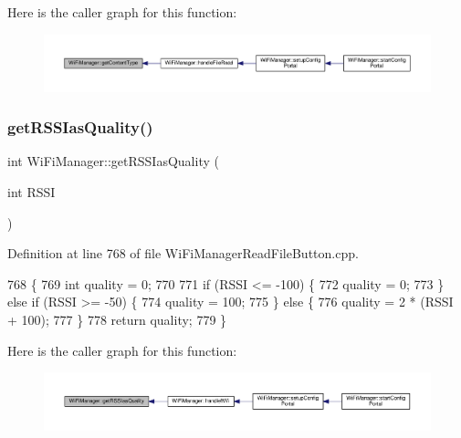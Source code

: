 Here is the caller graph for this function\+:
\nopagebreak
\begin{figure}[H]
\begin{center}
\leavevmode
\includegraphics[width=350pt]{d4/dc8/class_wi_fi_manager_a40f123fd290c3e331c9785d19a88f3b8_icgraph}
\end{center}
\end{figure}
\mbox{\label{class_wi_fi_manager_ae71cfd6bd70ada2ca02e1d20b152d0e5}} 
\subsubsection{\texorpdfstring{get\+R\+S\+S\+Ias\+Quality()}{getRSSIasQuality()}}
{\footnotesize\ttfamily int Wi\+Fi\+Manager\+::get\+R\+S\+S\+Ias\+Quality (\begin{DoxyParamCaption}\item[{int}]{R\+S\+SI }\end{DoxyParamCaption})\hspace{0.3cm}{\ttfamily [private]}}



Definition at line 768 of file Wi\+Fi\+Manager\+Read\+File\+Button.\+cpp.


\begin{DoxyCode}
768                                           \{
769   \textcolor{keywordtype}{int} quality = 0;
770 
771   \textcolor{keywordflow}{if} (RSSI <= -100) \{
772     quality = 0;
773   \} \textcolor{keywordflow}{else} \textcolor{keywordflow}{if} (RSSI >= -50) \{
774     quality = 100;
775   \} \textcolor{keywordflow}{else} \{
776     quality = 2 * (RSSI + 100);
777   \}
778   \textcolor{keywordflow}{return} quality;
779 \}
\end{DoxyCode}
Here is the caller graph for this function\+:
\nopagebreak
\begin{figure}[H]
\begin{center}
\leavevmode
\includegraphics[width=350pt]{d4/dc8/class_wi_fi_manager_ae71cfd6bd70ada2ca02e1d20b152d0e5_icgraph}
\end{center}
\end{figure}
\mbox{\label{class_wi_fi_manager_ac924dc071144e609afcf52073176c11f}} 
